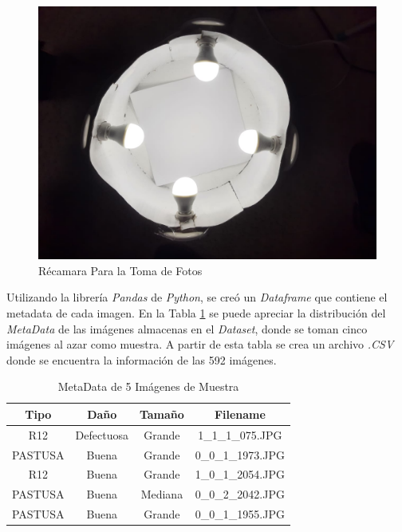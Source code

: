 \begin{figure}[ht]
	\centering
	\includegraphics[scale=0.15]{Figs/Chamber.JPEG}
	\caption{Récamara Para la Toma de Fotos}
	\label{fig:chamber}
\end{figure}

Utilizando la librería \textit{Pandas} de \textit{Python}, se creó un \textit{Dataframe} que contiene el metadata de cada imagen. En la Tabla \ref{table:metadata} se puede apreciar la distribución del \textit{MetaData} de las imágenes almacenas en el \textit{Dataset}, donde se toman cinco imágenes al azar como muestra. A partir de esta tabla se crea un archivo \textit{.CSV} donde se encuentra la información de las 592 imágenes.

\begin{table}[ht]
	\centering
	\begin{tabular}{|c|c|c|c|}
		\hline
		Tipo & Daño & Tamaño & Filename \\
		\hline
		R12 & Defectuosa & Grande & 1\_1\_1\_075.JPG \\
		\hline
		PASTUSA & Buena & Grande & 0\_0\_1\_1973.JPG \\
		\hline
		R12 & Buena & Grande & 1\_0\_1\_2054.JPG \\
		\hline
		PASTUSA & Buena & Mediana & 0\_0\_2\_2042.JPG \\
		\hline
		PASTUSA & Buena & Grande & 0\_0\_1\_1955.JPG \\
		\hline
	\end{tabular}	
	\caption{MetaData de 5 Imágenes de Muestra}
	\label{table:metadata}
\end{table}


